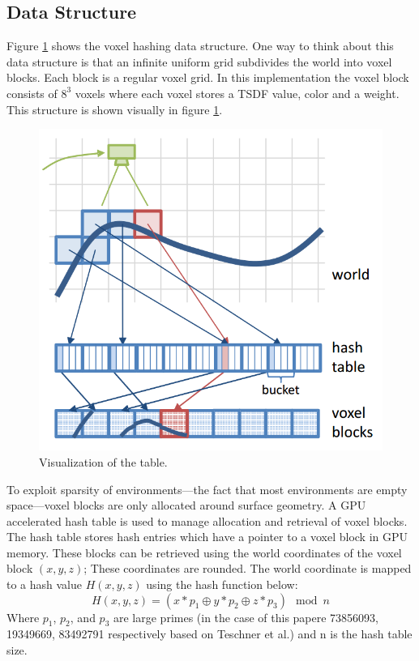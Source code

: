 \documentclass[10pt, twocolumn]{article}
\begin{document}
\subsection{Data Structure}
Figure \ref{fig:hashtable} shows the voxel hashing data structure. One way to think
about this data structure is that an infinite uniform grid subdivides the world
into voxel blocks. Each block is a regular voxel grid. In this implementation
the voxel block consists of $8^3$ voxels where each voxel stores a TSDF value, color
and a weight. This structure is shown visually in figure \ref{fig:hashtable}.

\begin{figure}
  \centering
  \includegraphics[width=1.0\linewidth]{hashtable}
  \caption{Visualization of the table.}
  \label{fig:hashtable}
\end{figure}


To exploit sparsity of environments---the fact that most environments are
empty space---voxel blocks are only allocated around surface geometry. A GPU
accelerated hash table is used to manage allocation and retrieval of voxel
blocks. The hash table stores hash entries which have a pointer to a voxel block
in GPU memory. These blocks can be retrieved using the world coordinates of the
voxel block $(x,y,z)$; These coordinates are rounded. The world coordinate is
mapped to a hash value $H(x,y,z)$ using the hash function below:
\begin{equation}
  H(x,y,z) = (x * p_1 \oplus y * p_2 \oplus z * p_3) \mod n
\end{equation}
Where $p_1$, $p_2$, and $p_3$ are large primes (in the case of this papere 73856093,
19349669, 83492791 respectively based on Teschner et al.) and n is the hash
table size. 
\end{document}
